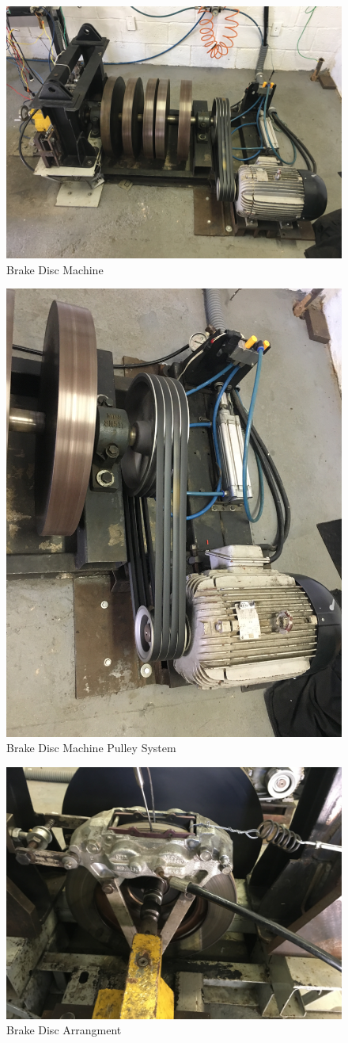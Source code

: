 		\begin{figure}[htbp]
			\centering
			\includegraphics[width=.5\textwidth]{figuras/fig-brake-disc-machine}
			\caption{Brake Disc Machine}
			\label{fig:brake-disc-machine}
		\end{figure}

		\begin{figure}[htbp]
			\centering
			\includegraphics[width=.5\textwidth]{figuras/fig-brake-disc-machine-pulley}
			\caption{Brake Disc Machine Pulley System}
			\label{fig:brake-disc-machine-pulley}
		\end{figure}

		\begin{figure}[htbp]
			\centering
			\includegraphics[width=.5\textwidth]{figuras/fig-brake-disc}
			\caption{Brake Disc Arrangment}
			\label{fig:brake-disc}
		\end{figure}
		\par

